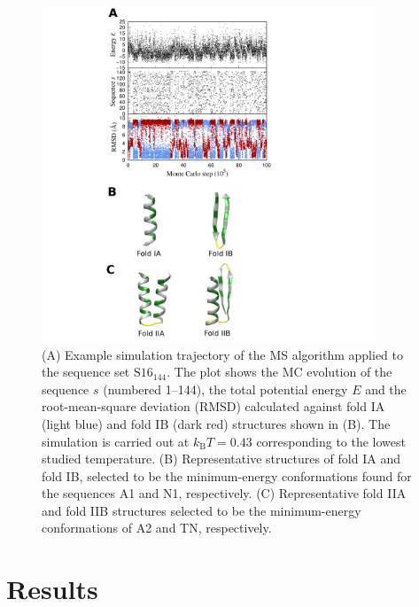 \documentclass[
aip,
rsi,%
amsmath,amssymb,
reprint,%
]{revtex4-1}
\newcommand	 {\sbar}	{{s}}
\newcommand	 {\kb}		{{k_\mathrm{B}}}
\begin{document}
\begin{figure}
\includegraphics[width=10.0cm]{MCTrajFolds}
\caption{(A) Example simulation trajectory of the MS algorithm applied to the sequence set $\mathrm{S16}_{144}$. The plot shows the MC evolution of the sequence $\sbar$ (numbered 1--144), the total potential energy $E$ and the root-mean-square deviation (RMSD) calculated against fold IA (light blue) and fold IB (dark red) structures shown in (B). The simulation is carried out at $\kb T = 0.43$ corresponding to the lowest studied temperature.  (B) Representative structures of fold IA and fold IB, selected to be the minimum-energy conformations found for the sequences A1 and N1, respectively. (C) Representative fold IIA and fold IIB structures selected to be the minimum-energy conformations of A2 and TN, respectively. }
\end{figure}

%
%
%
%

\section{Results}
\end{document}
